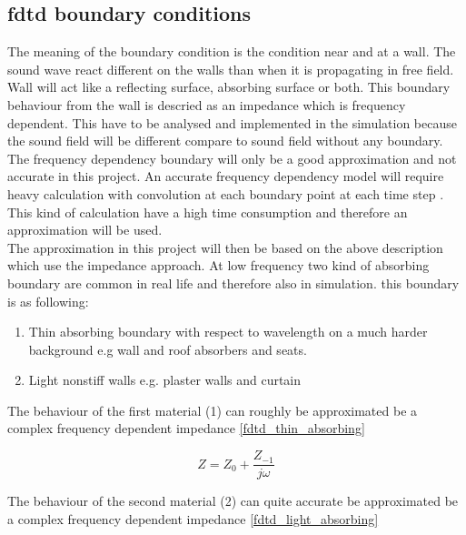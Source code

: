 \subsection{\gls{fdtd} boundary conditions}        
The meaning of the boundary condition is the condition near and at a wall. The sound wave react different on the walls than when it is propagating in free field. Wall will act like a reflecting surface, absorbing surface or both. This boundary behaviour from the wall is descried as an impedance which is frequency dependent. This have to be analysed and implemented in the simulation because the sound field will be different compare to sound field without any boundary. The frequency dependency boundary will only be a good approximation and not accurate in this project. An accurate frequency dependency model will require heavy calculation with convolution at each boundary point at each time step \citep{finiteproblems}. This kind of calculation have a high time consumption and therefore an approximation will be used. \\
The approximation in this project will then be based on the above description which use the impedance approach. \citep{FDTDmodelling} At low frequency two kind of absorbing boundary are common in real life and therefore also in simulation. this boundary is as following:

\begin{enumerate}
\item Thin absorbing boundary with respect to wavelength on a much harder background e.g wall and roof absorbers and seats.
\item Light nonstiff walls e.g. plaster walls and curtain 
\end{enumerate}


The behaviour of the first material (1) can roughly be approximated be a complex frequency dependent impedance \autoref{fdtd_thin_absorbing}

\begin{equation}\label{fdtd_thin_absorbing}
Z= Z_0+\frac{Z_{-1}}{j\omega}
\end{equation}

         \startexplain
    \stopexplain

The behaviour of the second material (2) can quite accurate be approximated be a complex frequency dependent impedance \autoref{fdtd_light_absorbing}

